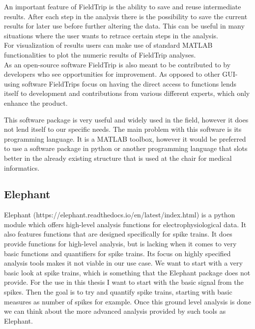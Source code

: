 An important feature of FieldTrip is the ability to save and reuse intermediate results. After each step in the analysis there is the possibility to save the current results for later use before further altering the data. This can be useful in many situations where the user wants to retrace certain steps in the analysis.\\
For visualization of results users can make use of standard MATLAB functionalities to plot the numeric results of FieldTrip analyses.\\
As an open-source software FieldTrip is also meant to be contributed to by developers who see opportunities for improvement. As opposed to other GUI-using software FieldTrips focus on having the direct access to functions lends itself to development and contributions from various different experts, which only enhance the product.

This software package is very useful and widely used in the field, however it does not lend itself to our specific needs.
The main problem with this software is its programming language. It is a MATLAB toolbox, however it would be preferred to use a software package in python or another programming language that slots better in the already existing structure that is used at the chair for medical informatics.  

\subsection{Elephant}
Elephant (https://elephant.readthedocs.io/en/latest/index.html) is a python module which offers high-level analysis functions for electrophysiological data.
It also features functions that are designed specifically for spike trains. It does provide functions for high-level analysis, but is lacking when it comes to very basic functions and quantifiers for spike trains. 
Its focus on highly specified analysis tools makes it not viable in our use case. We want to start with a very basic look at spike trains, which is something that the Elephant package does not provide.
For the use in this thesis I want to start with the basic signal from the spikes. Then the goal is to try and quantify spike trains, starting with basic measures as number of spikes for example. Once this ground level analysis is done we can think about the more advanced analysis provided by such tools as Elephant.

